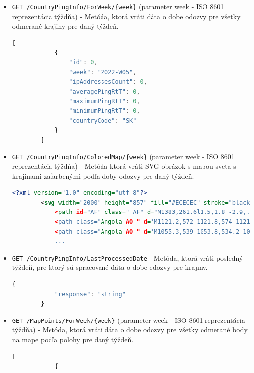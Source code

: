 \begin{itemize}
    \item \verb|GET /CountryPingInfo/ForWeek/{week}| (parameter week - ISO 8601 reprezentácia týždňa) - Metóda, ktorá vráti dáta o dobe odozvy pre všetky odmerané krajiny pre daný týždeň. 
    \begin{lstlisting}[language={TypeScript},caption={Vzorový výstup z endpointu},label=alg:get_country_ping_info_example]
        [
            {
                "id": 0,
                "week": "2022-W05",
                "ipAddressesCount": 0,
                "averagePingRtT": 0,
                "maximumPingRtT": 0,
                "minimumPingRtT": 0,
                "countryCode": "SK"
            }
        ]
    \end{lstlisting}
    \item \verb|GET /CountryPingInfo/ColoredMap/{week}| (parameter week - ISO 8601 reprezentácia týždňa) - Metóda ktorá vráti SVG obrázok s mapou sveta s krajinami zafarbenými podľa doby odozvy pre daný týždeň. 
    \begin{lstlisting}[language={XML},caption={Vzorový výstup z endpointu},label=alg:get_country_ping_info_map_example]
        <?xml version="1.0" encoding="utf-8"?>
        <svg width="2000" height="857" fill="#ECECEC" stroke="black" stroke-width=".2"...
            <path id="AF" class=" AF" d="M1383,261.6l1.5,1.8 -2.9,.8 -2.4,1.1 -5.9,.8 -5.3,1.3 ...
            <path class="Angola AO " d="M1121.2,572 1121.8,574 1121.1,577.1 1122,580.1 1121.1, ...
            <path class="Angola AO " d="M1055.3,539 1053.8,534.2 1056.1,531.4 1057.8,530.3 ...
            ...
    \end{lstlisting}
    \item \verb|GET /CountryPingInfo/LastProcessedDate| - Metóda, ktorá vráti posledný týždeň, pre ktorý sú spracované dáta o dobe odozvy pre krajiny.
    \begin{lstlisting}[language={TypeScript},caption={Vzorový výstup z endpointu},label=alg:last_date_example]
        {
            "response": "string"
        }
    \end{lstlisting}
    \item \verb|GET /MapPoints/ForWeek/{week}| (parameter week - ISO 8601 reprezentácia týždňa) - Metóda, ktorá vráti dáta o dobe odozvy pre všetky odmerané body na mape podľa polohy pre daný týždeň. 
    \begin{lstlisting}[language={TypeScript},caption={Vzorový výstup z endpointu},label=alg:get_map_points_info_example]
        [
            {

\end{lstlisting}
\end{itemize}
